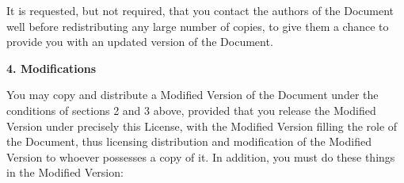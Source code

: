 \documentclass{doc}
\begin{document}
It is requested, but not required, that you contact the authors of the
Document well before redistributing any large number of copies, to give
them a chance to provide you with an updated version of the Document.


\noindent\textbf{4. Modifications}

You may copy and distribute a Modified Version of the Document under
the conditions of sections 2 and 3 above, provided that you release
the Modified Version under precisely this License, with the Modified
Version filling the role of the Document, thus licensing distribution
and modification of the Modified Version to whoever possesses a copy
of it.  In addition, you must do these things in the Modified Version:

\begin{itemize}


\end{itemize}
\end{document}

